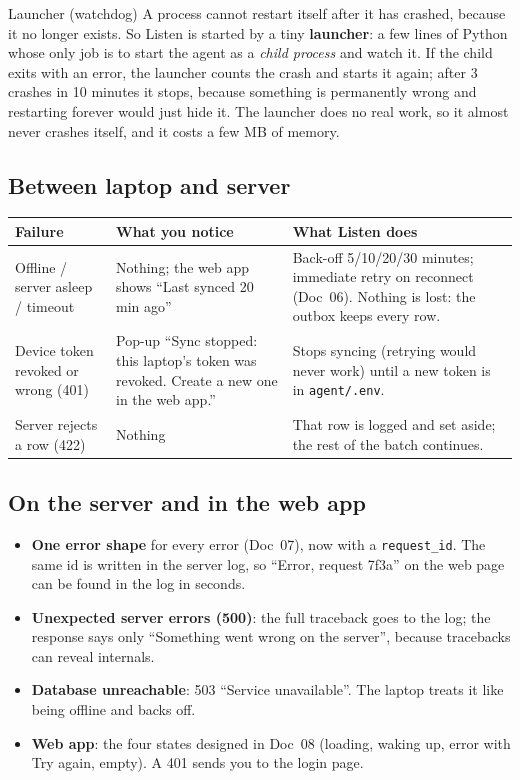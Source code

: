 \documentclass[11pt,a4paper]{article}
\begin{document}
\begin{concept}{Launcher (watchdog)}
A process cannot restart itself after it has crashed, because it no longer exists. So Listen is
started by a tiny \textbf{launcher}: a few lines of Python whose only job is to start the agent
as a \emph{child process} and watch it. If the child exits with an error, the launcher counts the
crash and starts it again; after 3 crashes in 10 minutes it stops, because something is
permanently wrong and restarting forever would just hide it. The launcher does no real work, so
it almost never crashes itself, and it costs a few MB of memory.
\end{concept}

\subsection{Between laptop and server}
\begin{center}
\small
\renewcommand{\arraystretch}{1.2}
\begin{tabularx}{\textwidth}{>{\raggedright\arraybackslash}p{3.3cm} >{\raggedright\arraybackslash}X >{\raggedright\arraybackslash}X}
\toprule
\textbf{Failure} & \textbf{What you notice} & \textbf{What Listen does} \\
\midrule
Offline / server asleep / timeout & Nothing; the web app shows ``Last synced 20 min ago'' & Back-off 5/10/20/30 minutes; immediate retry on reconnect (Doc~06). Nothing is lost: the outbox keeps every row. \\
Device token revoked or wrong (401) & Pop-up ``Sync stopped: this laptop's token was revoked. Create a new one in the web app.'' & Stops syncing (retrying would never work) until a new token is in \texttt{agent/.env}. \\
Server rejects a row (422) & Nothing & That row is logged and set aside; the rest of the batch continues. \\
\bottomrule
\end{tabularx}
\end{center}

\subsection{On the server and in the web app}
\begin{itemize}[nosep]
  \item \textbf{One error shape} for every error (Doc~07), now with a \texttt{request\_id}. The
        same id is written in the server log, so ``Error, request 7f3a'' on the web page can be
        found in the log in seconds.
  \item \textbf{Unexpected server errors (500)}: the full traceback goes to the log; the response
        says only ``Something went wrong on the server'', because tracebacks can reveal internals.
  \item \textbf{Database unreachable}: 503 ``Service unavailable''. The laptop treats it like
        being offline and backs off.
  \item \textbf{Web app}: the four states designed in Doc~08 (loading, waking up, error with Try
        again, empty). A 401 sends you to the login page.
\end{itemize}
\end{document}
